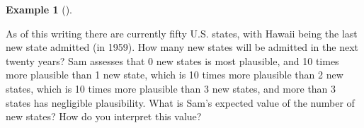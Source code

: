 \documentclass[
  letterpaper,
  DIV=11,
  numbers=noendperiod]{scrreprt}
\theoremstyle{plain}
\theoremstyle{definition}
\newtheorem{example}{Example}[chapter]
\theoremstyle{definition}
\theoremstyle{definition}
\theoremstyle{remark}
\begin{document}
\begin{tcolorbox}[enhanced jigsaw, opacityback=0, left=2mm, colframe=quarto-callout-note-color-frame, toprule=.15mm, breakable, colback=white, leftrule=.75mm, arc=.35mm, rightrule=.15mm, bottomrule=.15mm]

\begin{example}[]\protect\hypertarget{exm-ev-subjective}{}\label{exm-ev-subjective}

As of this writing there are currently fifty U.S. states, with Hawaii
being the last new state admitted (in 1959). How many new states will be
admitted in the next twenty years? Sam assesses that 0 new states is
most plausible, and 10 times more plausible than 1 new state, which is
10 times more plausible than 2 new states, which is 10 times more
plausible than 3 new states, and more than 3 states has negligible
plausibility. What is Sam's expected value of the number of new states?
How do you interpret this value?

\end{example}

\end{tcolorbox}
\end{document}
